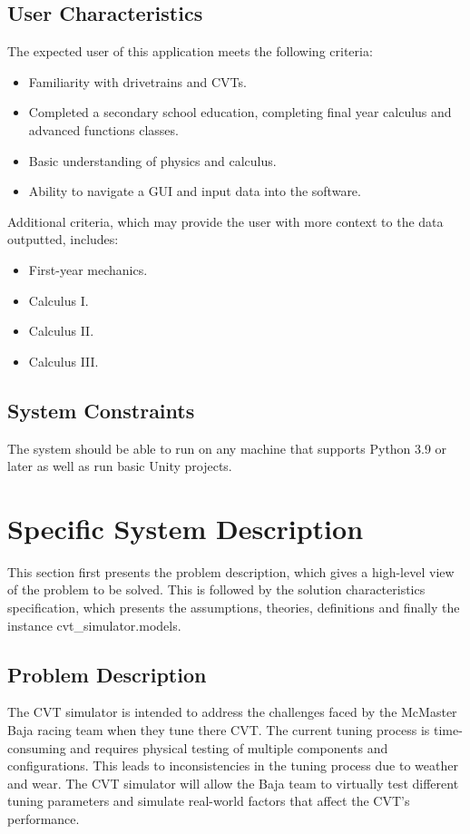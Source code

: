 \documentclass[12pt]{article}
\begin{document}
\subsection{User Characteristics} \label{SecUserCharacteristics}
The expected user of this application meets the following criteria:
\begin{itemize}
  \item Familiarity with drivetrains and CVTs.
  \item Completed a secondary school education, completing final year calculus and advanced functions classes.
  \item Basic understanding of physics and calculus.
  \item Ability to navigate a GUI and input data into the software.
\end{itemize}
Additional criteria, which may provide the user with more context to the data outputted, includes:
\begin{itemize}
  \item First-year mechanics.
  \item Calculus I.
  \item Calculus II.
  \item Calculus III.
\end{itemize}

\subsection{System Constraints}

The system should be able to run on any machine that supports Python 3.9 or later as well as run basic Unity projects.

\section{Specific System Description}

This section first presents the problem description, which gives a high-level
view of the problem to be solved.  This is followed by the solution characteristics
specification, which presents the assumptions, theories, definitions and finally
the instance cvt_simulator.models. 

\subsection{Problem Description} \label{Sec_pd}

The CVT simulator is intended to address the challenges faced by the McMaster Baja racing team when they tune there CVT.
The current tuning process is time-consuming and requires physical testing of multiple components and configurations. This leads to inconsistencies in the tuning process due to weather and wear.
The CVT simulator will allow the Baja team to virtually test different tuning parameters and simulate real-world factors that affect the CVT's performance.
\end{document}
